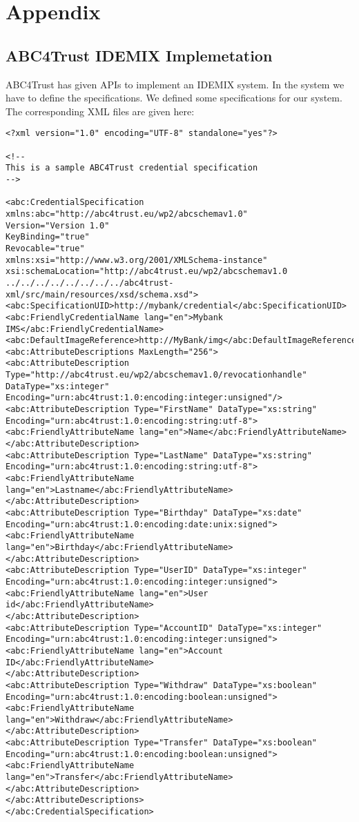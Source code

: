 \chapter{Appendix}
\section{ABC4Trust IDEMIX Implemetation}
ABC4Trust has given APIs\cite{bichsel2013h2}\cite{camenisch2012h2} to implement an IDEMIX system. In the system we have to define the specifications. We defined some specifications for our system. The corresponding XML files are given here:

\lstset{language=XML}
\begin{lstlisting}[caption=IDEMIX Credential Specificataion]
<?xml version="1.0" encoding="UTF-8" standalone="yes"?>

<!--
This is a sample ABC4Trust credential specification
-->

<abc:CredentialSpecification xmlns:abc="http://abc4trust.eu/wp2/abcschemav1.0"
Version="Version 1.0"
KeyBinding="true"
Revocable="true"
xmlns:xsi="http://www.w3.org/2001/XMLSchema-instance" 
xsi:schemaLocation="http://abc4trust.eu/wp2/abcschemav1.0 ../../../../../../../../abc4trust-xml/src/main/resources/xsd/schema.xsd">
<abc:SpecificationUID>http://mybank/credential</abc:SpecificationUID>
<abc:FriendlyCredentialName lang="en">Mybank IMS</abc:FriendlyCredentialName>
<abc:DefaultImageReference>http://MyBank/img</abc:DefaultImageReference>
<abc:AttributeDescriptions MaxLength="256">
<abc:AttributeDescription Type="http://abc4trust.eu/wp2/abcschemav1.0/revocationhandle" DataType="xs:integer" Encoding="urn:abc4trust:1.0:encoding:integer:unsigned"/>
<abc:AttributeDescription Type="FirstName" DataType="xs:string" Encoding="urn:abc4trust:1.0:encoding:string:utf-8">
<abc:FriendlyAttributeName lang="en">Name</abc:FriendlyAttributeName>
</abc:AttributeDescription>
<abc:AttributeDescription Type="LastName" DataType="xs:string" Encoding="urn:abc4trust:1.0:encoding:string:utf-8">
<abc:FriendlyAttributeName lang="en">Lastname</abc:FriendlyAttributeName>
</abc:AttributeDescription>
<abc:AttributeDescription Type="Birthday" DataType="xs:date" Encoding="urn:abc4trust:1.0:encoding:date:unix:signed">
<abc:FriendlyAttributeName lang="en">Birthday</abc:FriendlyAttributeName>
</abc:AttributeDescription>
<abc:AttributeDescription Type="UserID" DataType="xs:integer" Encoding="urn:abc4trust:1.0:encoding:integer:unsigned">
<abc:FriendlyAttributeName lang="en">User id</abc:FriendlyAttributeName>
</abc:AttributeDescription>
<abc:AttributeDescription Type="AccountID" DataType="xs:integer" Encoding="urn:abc4trust:1.0:encoding:integer:unsigned">
<abc:FriendlyAttributeName lang="en">Account ID</abc:FriendlyAttributeName>
</abc:AttributeDescription>
<abc:AttributeDescription Type="Withdraw" DataType="xs:boolean" Encoding="urn:abc4trust:1.0:encoding:boolean:unsigned">
<abc:FriendlyAttributeName lang="en">Withdraw</abc:FriendlyAttributeName>
</abc:AttributeDescription>
<abc:AttributeDescription Type="Transfer" DataType="xs:boolean" Encoding="urn:abc4trust:1.0:encoding:boolean:unsigned">
<abc:FriendlyAttributeName lang="en">Transfer</abc:FriendlyAttributeName>
</abc:AttributeDescription>
</abc:AttributeDescriptions>
</abc:CredentialSpecification>
\end{lstlisting}
